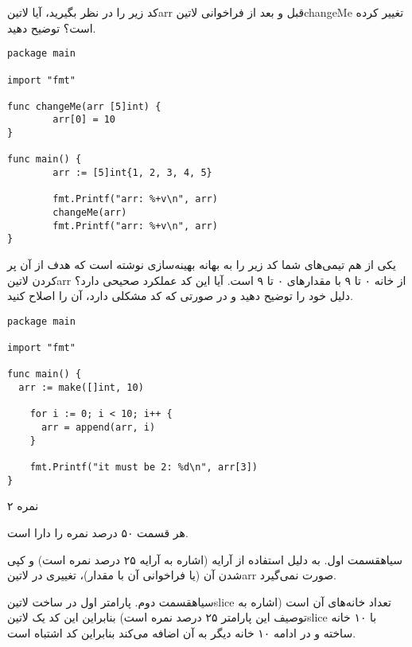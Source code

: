 \documentclass[../main.tex]{subfiles}
\begin{document}

کد زیر را در نظر بگیرید، آیا ‌لاتین{arr} قبل و بعد از فراخوانی ‌لاتین{changeMe} تغییر کرده است؟ توضیح دهید.

\begin{latin}
\begin{verbatim}
package main

import "fmt"

func changeMe(arr [5]int) {
        arr[0] = 10
}

func main() {
        arr := [5]int{1, 2, 3, 4, 5}

        fmt.Printf("arr: %+v\n", arr)
        changeMe(arr)
        fmt.Printf("arr: %+v\n", arr)
}
\end{verbatim}
\end{latin}

یکی از هم تیمی‌های شما کد زیر را به بهانه بهینه‌سازی نوشته است که هدف
از آن پر کردن ‌لاتین{arr} از خانه ۰ تا ۹ با مقدارهای ۰ تا ۹ است.
آیا این کد عملکرد صحیحی دارد؟ دلیل خود را توضیح دهید و در صورتی
که کد مشکلی دارد، آن را اصلاح کنید.

\begin{latin}
\begin{verbatim}
package main

import "fmt"

func main() {
  arr := make([]int, 10)

    for i := 0; i < 10; i++ {
      arr = append(arr, i)
    }

    fmt.Printf("it must be 2: %d\n", arr[3])
}

\end{verbatim}
\end{latin}

۲ نمره


هر قسمت ۵۰ درصد نمره را دارا است.

‌سیاه{قسمت اول}.
به دلیل استفاده از آرایه (اشاره به آرایه ۲۵ درصد نمره است) و کپی شدن آن (یا فراخوانی آن با مقدار)، تغییری در ‌لاتین{arr} صورت نمی‌گیرد.

‌سیاه{قسمت دوم}.
پارامتر اول در ساخت ‌لاتین{slice} تعداد خانه‌های آن است (اشاره به توصیف این پارامتر ۲۵ درصد نمره است) بنابراین این کد یک ‌لاتین{slice} با ۱۰ خانه ساخته و در ادامه ۱۰ خانه دیگر به آن اضافه می‌کند بنابراین
کد اشتباه است.

\end{document}
